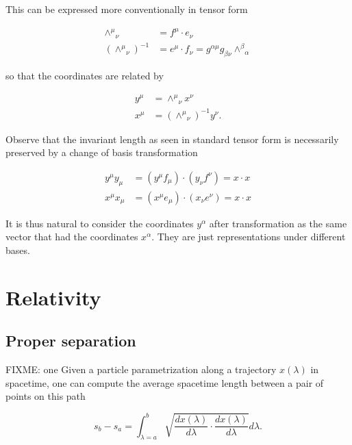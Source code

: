 This can be expressed more conventionally in tensor form

\begin{align}\label{eqn:grahamSchmidtLorentz:1120}
{\wedge^\mu}_\nu &= f^\mu \cdot e_\nu \\
({\wedge^\mu}_\nu)^{-1} &= e^\mu \cdot f_\nu = g^{\alpha \mu} g_{\beta \nu} {\wedge^\beta}_\alpha
\end{align}

so that the coordinates are related by

\begin{align}\label{eqn:grahamSchmidtLorentz:1140}
y^\mu &= {\wedge^\mu}_\nu x^\nu \\
x^\mu &= ({\wedge^\mu}_\nu)^{-1} y^\nu.
\end{align}

Observe that the invariant length as seen in standard tensor form is necessarily preserved by a change of basis transformation

\begin{align}\label{eqn:grahamSchmidtLorentz:1160}
y^\mu y_\mu &= (y^\mu f_\mu) \cdot (y_\nu f^\nu) = x \cdot x \\
x^\mu x_\mu &= (x^\mu e_\mu) \cdot (x_\nu e^\nu) = x \cdot x 
\end{align}

It is thus natural to consider the coordinates $y^\alpha$ after transformation as the same vector that had the coordinates $x^\alpha$.  They are just representations under different bases.

\section{Relativity}
\subsection{Proper separation}

FIXME: one
Given a particle parametrization along a trajectory $x(\lambda)$ in spacetime, one can compute the average spacetime length between a pair of points on this path

\begin{equation}\label{eqn:grahamSchmidtLorentz:400}
s_b - s_a = \int_{\lambda = a}^b \sqrt{ \frac{d x(\lambda)}{d\lambda} \cdot \frac{d x(\lambda)}{d\lambda} } d\lambda.
\end{equation}

%
%
%

